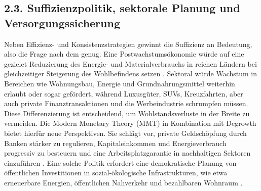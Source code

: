 \documentclass[12pt, a4paper]{article}
\begin{document}
	\subsection*{2.3. Suffizienzpolitik, sektorale Planung und Versorgungssicherung}
	Neben Effizienz- und Konsistenzstrategien gewinnt die Suffizienz an Bedeutung, also
	die Frage nach dem genug.
	Eine Postwachstumsökonomie würde auf eine gezielet
	Reduzierung des Energie- und Materialverbrauchs in reichen Ländern bei gleichzeitiger
	Steigerung des Wohlbefindens setzen \cite{greenpeace2025b}.
	Sektoral würde Wachstum
	in Bereichen wie Wohnungsbau, Energie und Grundnahrungsmittel weiterhin erlaubt oder
	sogar gefördert, während Luxusgüter, SUVs, Kreuzfahrten, aber auch private
	Finanztransaktionen und die Werbeindustrie schrumpfen müssen.
	Diese Differenzierung
	ist entscheidend, um Wohlstandsverluste in der Breite zu vermeiden.
	Die Modern
	Monetary Theory (MMT) in Kombination mit Degrowth bietet hierfür neue Perspektiven.
	Sie schlägt vor, private Geldschöpfung durch Banken stärker zu regulieren,
	Kapitaleinkommen und Energieverbrauch progressiv zu besteuern und eine
	Arbeitsplatzgarantie in nachhaltigen Sektoren einzuführen \cite{wu2023}.
	Eine solche
	Politik erfordert eine demokratische Planung von öffentlichen Investitionen in
	sozial-ökologische Infrastrukturen, wie etwa erneuerbare Energien, öffentlichen
	Nahverkehr und bezahlbaren Wohnraum \cite{scientists4future2025}.
	
\end{document}
